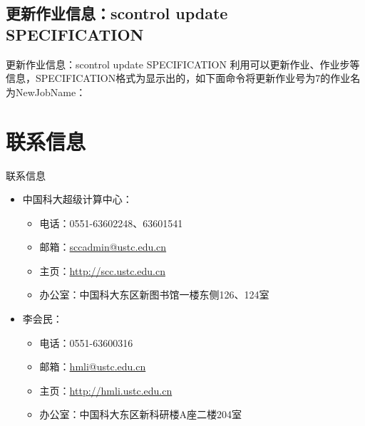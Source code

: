 \subsection{更新作业信息：scontrol update SPECIFICATION}
\begin{frame}{更新作业信息：scontrol update SPECIFICATION}
利用可以更新作业、作业步等信息，SPECIFICATION格式为显示出的，如下面命令将更新作业号为7的作业名为NewJobName：

\end{frame}

\section{联系信息}
\begin{frame}{联系信息}
\begin{itemize}
    \item 中国科大超级计算中心：
    \begin{itemize}
        \item 电话：0551-63602248、63601541
        \item 邮箱：\href{mailto:sccadmin@ustc.edu.cn}{sccadmin@ustc.edu.cn}
        \item 主页：\url{http://scc.ustc.edu.cn}
        \item 办公室：中国科大东区新图书馆一楼东侧126、124室
    \end{itemize}
    \item 李会民：
    \begin{itemize}
        \item 电话：0551-63600316
        \item 邮箱：\href{mailto:hmli@ustc.edu.cn}{hmli@ustc.edu.cn}
        \item 主页：\url{http://hmli.ustc.edu.cn}
        \item 办公室：中国科大东区新科研楼A座二楼204室
    \end{itemize}
\end{itemize}
\end{frame}


